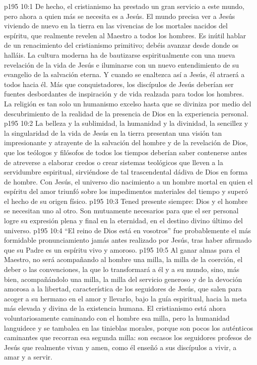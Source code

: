 \vs p195 10:1 De hecho, el cristianismo ha prestado un gran servicio a este mundo, pero ahora a quien más se necesita es a Jesús. El mundo precisa ver a Jesús viviendo de nuevo en la tierra en las vivencias de los mortales nacidos del espíritu, que realmente revelen al Maestro a todos los hombres. Es inútil hablar de un renacimiento del cristianismo primitivo; debéis avanzar desde donde os halláis. La cultura moderna ha de bautizarse espiritualmente con una nueva revelación de la vida de Jesús e iluminarse con un nuevo entendimiento de su evangelio de la salvación eterna. Y cuando se enaltezca así a Jesús, él atraerá a todos hacia él. Más que conquistadores, los discípulos de Jesús deberían ser fuentes desbordantes de inspiración y de vida realzada para todos los hombres. La religión es tan solo un humanismo excelso hasta que se diviniza por medio del descubrimiento de la realidad de la presencia de Dios en la experiencia personal.
\vs p195 10:2 La belleza y la sublimidad, la humanidad y la divinidad, la sencillez y la singularidad de la vida de Jesús en la tierra presentan una visión tan impresionante y atrayente de la salvación del hombre y de la revelación de Dios, que los teólogos y filósofos de todos los tiempos deberían saber contenerse antes de atreverse a elaborar credos o crear sistemas teológicos que lleven a la servidumbre espiritual, sirviéndose de tal trascendental dádiva de Dios en forma de hombre. Con Jesús, el universo dio nacimiento a un hombre mortal en quien el espíritu del amor triunfó sobre los impedimentos materiales del tiempo y superó el hecho de su origen físico.
\vs p195 10:3 \pc Tened presente siempre: Dios y el hombre se necesitan uno al otro. Son mutuamente necesarios para que el ser personal logre su expresión plena y final en la eternidad, en el destino divino último del universo.
\vs p195 10:4 “El reino de Dios está en vosotros” fue probablemente el más formidable pronunciamiento jamás antes realizado por Jesús, tras haber afirmado que su Padre es un espíritu vivo y amoroso.
\vs p195 10:5 \pc Al ganar almas para el Maestro, no será acompañando al hombre una milla, la milla de la coerción, el deber o las convenciones, la que lo transformará a él y a su mundo, sino, más bien, acompañándolo una  milla, la milla del servicio generoso y de la devoción amorosa a la libertad, característica de los seguidores de Jesús, que salen para acoger a su hermano en el amor y llevarlo, bajo la guía espiritual, hacia la meta más elevada y divina de la existencia humana. El cristianismo está ahora voluntariosamente caminando con el hombre esa  milla, pero la humanidad languidece y se tambalea en las tinieblas morales, porque son pocos los auténticos caminantes que recorran esa segunda milla: son escasos los seguidores profesos de Jesús que realmente vivan y amen, como él enseñó a sus discípulos a vivir, a amar y a servir.

